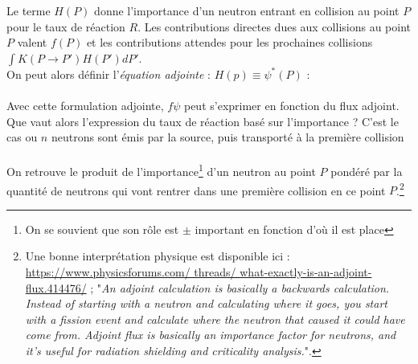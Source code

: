 		Le terme $H(P)$ donne l'importance d'un neutron entrant en collision au point $P$ pour le 
		taux de réaction $R$. Les contributions directes dues aux collisions au point $P$ valent 
		$f(P)$ et les contributions attendes pour les prochaines collisions 
		$\int    K(P \to P')H(P')dP'$.\\
		
		On peut alors définir l'\textit{équation adjointe} : $H(p)\equiv \psi^*(P)$ :\\
		
		\ \\
		
		Avec cette formulation adjointe, $f\psi$ peut s'exprimer en fonction du flux adjoint. Que 
		vaut alors l'expression du taux de réaction basé sur l'importance ? C'est le cas ou $n$ 
		neutrons sont émis par la source, puis transporté à la première collision\\
		
		\ \\
		
		On retrouve le produit de l'importance\footnote{On se souvient que son rôle est $\pm$ 
		important en fonction d'où il est place} d'un neutron au point $P$ pondéré par la 
		quantité de neutrons qui vont rentrer dans une première collision en ce point $P$.\footnote{
		Une bonne interprétation physique est disponible ici : \url{https://www.physicsforums.com/
		threads/
		what-exactly-is-an-adjoint-flux.414476/} ; "\textit{An adjoint calculation is basically a
		backwards calculation. Instead of starting with a neutron and calculating where it goes, you
		start with a fission event and calculate where the neutron that caused it could have come
		from. Adjoint flux is basically an importance factor for neutrons, and it's useful for
		radiation shielding and criticality analysis.}".}
		
